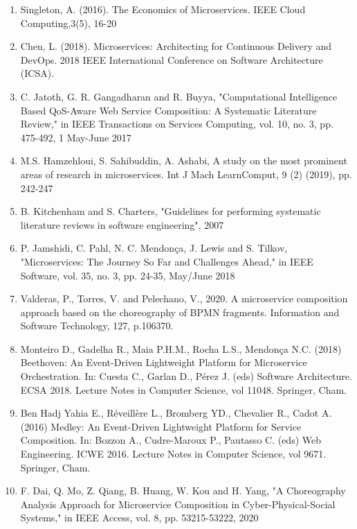 \documentclass{article}
\begin{document}
\begin{enumerate}
\item Singleton, A. (2016). The Economics of Microservices. IEEE Cloud Computing,3(5), 16-20

\item Chen, L. (2018). Microservices: Architecting for Continuous Delivery and DevOps. 2018 IEEE International Conference on Software Architecture (ICSA). 

\item C. Jatoth, G. R. Gangadharan and R. Buyya, "Computational Intelligence Based QoS-Aware Web Service Composition: A Systematic Literature Review," in IEEE Transactions on Services Computing, vol. 10, no. 3, pp. 475-492, 1 May-June 2017

\item M.S. Hamzehloui, S. Sahibuddin, A. Ashabi, A study on the most prominent areas of research in microservices. Int J Mach LearnComput, 9 (2) (2019), pp. 242-247

\item B. Kitchenham and S. Charters, "Guidelines for performing systematic literature reviews in software engineering", 2007

\item P. Jamshidi, C. Pahl, N. C. Mendonça, J. Lewis and S. Tilkov, "Microservices: The Journey So Far and Challenges Ahead," in IEEE Software, vol. 35, no. 3, pp. 24-35, May/June 2018

\item Valderas, P., Torres, V. and Pelechano, V., 2020. A microservice composition approach based on the choreography of BPMN fragments. Information and Software Technology, 127, p.106370.

\item Monteiro D., Gadelha R., Maia P.H.M., Rocha L.S., Mendonça N.C. (2018) Beethoven: An Event-Driven Lightweight Platform for Microservice Orchestration. In: Cuesta C., Garlan D., Pérez J. (eds) Software Architecture. ECSA 2018. Lecture Notes in Computer Science, vol 11048. Springer, Cham.

\item Ben Hadj Yahia E., Réveillère L., Bromberg YD., Chevalier R., Cadot A. (2016) Medley: An Event-Driven Lightweight Platform for Service Composition. In: Bozzon A., Cudre-Maroux P., Pautasso C. (eds) Web Engineering. ICWE 2016. Lecture Notes in Computer Science, vol 9671. Springer, Cham.

\item F. Dai, Q. Mo, Z. Qiang, B. Huang, W. Kou and H. Yang, "A Choreography Analysis Approach for Microservice Composition in Cyber-Physical-Social Systems," in IEEE Access, vol. 8, pp. 53215-53222, 2020


\end{enumerate}
\end{document}
